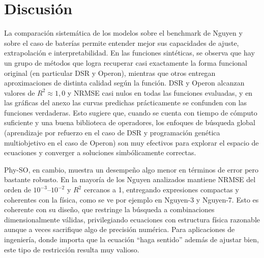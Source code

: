\newpage
\section{Discusión}

La comparación sistemática de los modelos sobre el benchmark de Nguyen y sobre el caso de baterías permite entender mejor sus capacidades de ajuste, extrapolación e interpretabilidad. En las funciones sintéticas, se observa que hay un grupo de métodos que logra recuperar casi exactamente la forma funcional original (en particular DSR y Operon), mientras que otros entregan aproximaciones de distinta calidad según la función. DSR y Operon alcanzan valores de $R^2 \approx 1{,}0$ y NRMSE casi nulos en todas las funciones evaluadas, y en las gráficas del anexo las curvas predichas prácticamente se confunden con las funciones verdaderas. Esto sugiere que, cuando se cuenta con tiempo de cómputo suficiente y una buena biblioteca de operadores, los enfoques de búsqueda global (aprendizaje por refuerzo en el caso de DSR y programación genética multiobjetivo en el caso de Operon) son muy efectivos para explorar el espacio de ecuaciones y converger a soluciones simbólicamente correctas.

Phy-SO, en cambio, muestra un desempeño algo menor en términos de error pero bastante robusto. En la mayoría de los Nguyen analizados mantiene NRMSE del orden de $10^{-3}$–$10^{-2}$ y $R^2$ cercanos a 1, entregando expresiones compactas y coherentes con la física, como se ve por ejemplo en Nguyen-3 y Nguyen-7. Esto es coherente con su diseño, que restringe la búsqueda a combinaciones dimensionalmente válidas, privilegiando ecuaciones con estructura física razonable aunque a veces sacrifique algo de precisión numérica. Para aplicaciones de ingeniería, donde importa que la ecuación “haga sentido” además de ajustar bien, este tipo de restricción resulta muy valioso.

